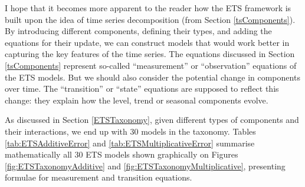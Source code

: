 \documentclass[]{book}
\theoremstyle{definition}
\theoremstyle{definition}
\theoremstyle{definition}
\theoremstyle{definition}
\theoremstyle{remark}
\begin{document}
I hope that it becomes more apparent to the reader how the ETS framework is built upon the idea of time series decomposition (from Section \ref{tsComponents}). By introducing different components, defining their types, and adding the equations for their update, we can construct models that would work better in capturing the key features of the time series. The equations discussed in Section \ref{tsComponents} represent so-called ``measurement'' or ``observation'' equations of the ETS models. But we should also consider the potential change in components over time. The ``transition'' or ``state'' equations are supposed to reflect this change: they explain how the level, trend or seasonal components evolve.

As discussed in Section \ref{ETSTaxonomy}, given different types of components and their interactions, we end up with 30 models in the taxonomy. Tables \ref{tab:ETSAdditiveError} and \ref{tab:ETSMultiplicativeError} summarise mathematically all 30 ETS models shown graphically on Figures \ref{fig:ETSTaxonomyAdditive} and \ref{fig:ETSTaxonomyMultiplicative}, presenting formulae for measurement and transition equations.
\end{document}
